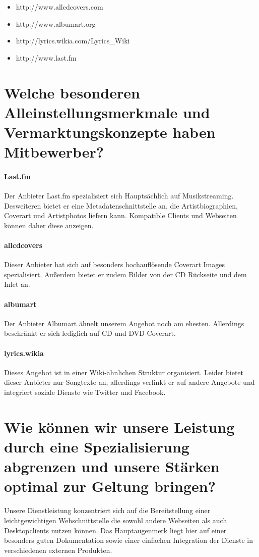 \documentclass[11pt]{scrreprt}
\begin{document}
\begin{itemize}
    \item http://www.allcdcovers.com
    \item http://www.albumart.org
    \item http://lyrics.wikia.com/Lyrics\_Wiki
    \item http://www.last.fm
\end{itemize}


\section{Welche besonderen Alleinstellungsmerkmale und
Vermarktungskonzepte haben Mitbewerber?}

\paragraph{Last.fm}
Der Anbieter Last.fm spezialisiert sich Hauptsächlich auf Musikstreaming.
Desweiteren bietet er eine Metadatenschnittstelle an, die Artistbiographien,
Coverart und Artistphotos liefern kann. Kompatible Clients und Webseiten können
daher diese anzeigen.


\paragraph{allcdcovers}
Dieser Anbieter hat sich auf besonders hochauflösende Coverart Images
spezialisiert. Außerdem bietet er zudem Bilder von der CD Rückseite und dem
Inlet an.

\paragraph{albumart}
Der Anbieter Albumart ähnelt unserem Angebot noch am ehesten. Allerdings
beschränkt er sich lediglich auf CD und DVD Coverart.


\paragraph{lyrics.wikia}
Dieses Angebot ist in einer Wiki-ähnlichen Struktur organisiert. Leider bietet
dieser Anbieter nur Songtexte an, allerdings verlinkt er auf andere Angebote und
integriert soziale Dienste wie Twitter und Facebook.


\section{Wie können wir unsere Leistung durch eine
    Spezialisierung abgrenzen und unsere Stärken
optimal zur Geltung bringen?}
Unsere Dienstleistung konzentriert sich auf die Bereitstellung einer
leichtgewichtigen Webschnittstelle die sowohl andere Webseiten als auch
Desktopclients nutzen können. Das Hauptaugenmerk liegt hier auf einer besonders
guten Dokumentation sowie einer einfachen Integration der Dienste in
verschiedenen externen Produkten.
\end{document}
